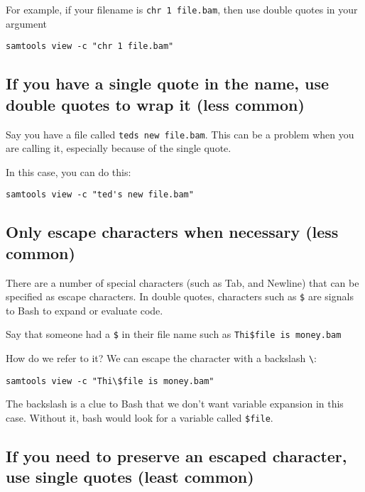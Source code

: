 \documentclass[
  letterpaper,
  DIV=11,
  numbers=noendperiod]{scrreprt}
\begin{document}
For example, if your filename is \texttt{chr\ 1\ file.bam}, then use
double quotes in your argument

\begin{verbatim}
samtools view -c "chr 1 file.bam"
\end{verbatim}

\subsection{If you have a single quote in the name, use double quotes to
wrap it (less
common)}\label{if-you-have-a-single-quote-in-the-name-use-double-quotes-to-wrap-it-less-common}

Say you have a file called
\texttt{ted\textquotesingle{}s\ new\ file.bam}. This can be a problem
when you are calling it, especially because of the single quote.

In this case, you can do this:

\begin{verbatim}
samtools view -c "ted's new file.bam"
\end{verbatim}

\subsection{Only escape characters when necessary (less
common)}\label{only-escape-characters-when-necessary-less-common}

There are a number of special characters (such as Tab, and Newline) that
can be specified as escape characters. In double quotes, characters such
as \texttt{\$} are signals to Bash to expand or evaluate code.

Say that someone had a \texttt{\$} in their file name such as
\texttt{Thi\$file\ is\ money.bam}

How do we refer to it? We can escape the character with a backslash
\texttt{\textbackslash{}}:

\begin{verbatim}
samtools view -c "Thi\$file is money.bam"
\end{verbatim}

The backslash is a clue to Bash that we don't want variable expansion in
this case. Without it, bash would look for a variable called
\texttt{\$file}.

\subsection{If you need to preserve an escaped character, use single
quotes (least
common)}\label{if-you-need-to-preserve-an-escaped-character-use-single-quotes-least-common}
\end{document}
